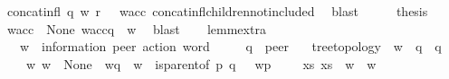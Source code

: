 \begin{isabellebody}
\ {\isacartoucheopen}concat{\isacharunderscore}{\kern0pt}infl\ q\ w\ {\isacharparenleft}{\kern0pt}r\ {\isacharhash}{\kern0pt}\ {\isasymepsilon}{\isacharparenright}{\kern0pt}\ w{\isacharunderscore}{\kern0pt}acc{\isacartoucheclose}\ concat{\isacharunderscore}{\kern0pt}infl{\isacharunderscore}{\kern0pt}children{\isacharunderscore}{\kern0pt}not{\isacharunderscore}{\kern0pt}included\ \isamarkupfalse%
\ blast\isanewline
\ \ \isamarkupfalse%
\ \isamarkupfalse%
\ {\isacharquery}{\kern0pt}thesis\ \isamarkupfalse%
\ {\isacartoucheopen}w{\isacharunderscore}{\kern0pt}acc\ {\isasymin}\ {\isasymT}\isactrlbsub None\isactrlesub {\isacartoucheclose}\ {\isacartoucheopen}w{\isacharunderscore}{\kern0pt}acc{\isasymdown}\isactrlsub q\ {\isacharequal}{\kern0pt}\ w{\isacartoucheclose}\ \isamarkupfalse%
\ blast\isanewline
{}\isamarkupfalse%
%
\endisatagproof
{\isafoldproof}%
%
\isadelimproof
\isanewline
%
\endisadelimproof
\ \ \isanewline
\isanewline
\isanewline
{}\isamarkupfalse%
\ lemm{}{\isacharunderscore}{\kern0pt}{}{\isacharunderscore}{\kern0pt}extra{\isacharcolon}{\kern0pt}\isanewline
\ \ \ w\ {\isacharcolon}{\kern0pt}{\isacharcolon}{\kern0pt}\ {\isachardoublequoteopen}{\isacharparenleft}{\kern0pt}{\isacharprime}{\kern0pt}information{\isacharcomma}{\kern0pt}\ {\isacharprime}{\kern0pt}peer{\isacharparenright}{\kern0pt}\ action\ word{\isachardoublequoteclose}\isanewline
\ \ \ \ \ q\ {\isacharcolon}{\kern0pt}{\isacharcolon}{\kern0pt}\ {\isachardoublequoteopen}{\isacharprime}{\kern0pt}peer{\isachardoublequoteclose}\isanewline
\ \ \ {\isachardoublequoteopen}tree{\isacharunderscore}{\kern0pt}topology{\isachardoublequoteclose}\ \ {\isachardoublequoteopen}w\ {\isasymin}\ {\isasymL}\isactrlsup {\isacharasterisk}{\kern0pt}{\isacharparenleft}{\kern0pt}q{\isacharparenright}{\kern0pt}{\isachardoublequoteclose}\ \ {\isachardoublequoteopen}q\ {\isasymin}\ {\isasymP}{\isachardoublequoteclose}\isanewline
\ \ \ {\isachardoublequoteopen}{\isasymexists}\ w{\isacharprime}{\kern0pt}{\isachardot}{\kern0pt}\ {\isacharparenleft}{\kern0pt}w{\isacharprime}{\kern0pt}\ {\isasymin}\ {\isasymT}\isactrlbsub None\isactrlesub \ {\isasymand}\ w{\isacharprime}{\kern0pt}{\isasymdown}\isactrlsub q\ {\isacharequal}{\kern0pt}\ w\ {\isasymand}\ {\isacharparenleft}{\kern0pt}{\isacharparenleft}{\kern0pt}is{\isacharunderscore}{\kern0pt}parent{\isacharunderscore}{\kern0pt}of\ p\ q{\isacharparenright}{\kern0pt}\ {\isasymlongrightarrow}\ \ w{\isacharprime}{\kern0pt}{\isasymdown}\isactrlsub p\ {\isacharequal}{\kern0pt}\ {\isasymepsilon}{\isacharparenright}{\kern0pt}{\isacharparenright}{\kern0pt}\ {\isasymand}\ {\isacharparenleft}{\kern0pt}{\isasymexists}\ xs{\isachardot}{\kern0pt}\ {\isacharparenleft}{\kern0pt}xs\ {\isacharat}{\kern0pt}\ w{\isacharparenright}{\kern0pt}\ {\isacharequal}{\kern0pt}\ w{\isacharprime}{\kern0pt}{\isacharparenright}{\kern0pt}{\isachardoublequoteclose}\isanewline

\end{isabellebody}
